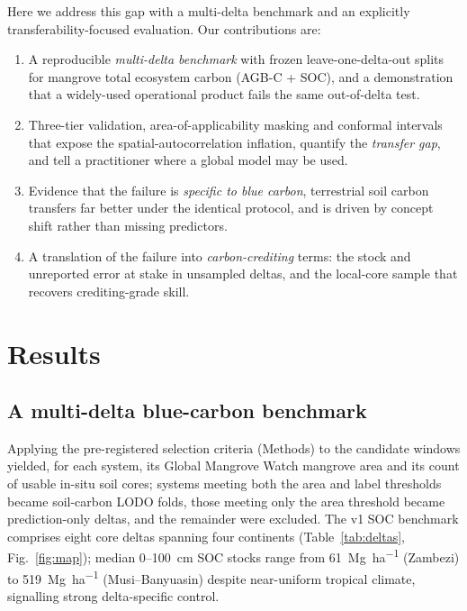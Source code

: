 \documentclass[twocolumn,9pt]{extarticle}
\begin{document}
Here we address this gap with a multi-delta benchmark and an explicitly
transferability-focused evaluation. Our contributions are:
\begin{enumerate}
  \item A reproducible \emph{multi-delta benchmark} with frozen leave-one-delta-out
        splits for mangrove total ecosystem carbon (AGB-C + SOC), and a demonstration
        that a widely-used operational product fails the same out-of-delta test.
  \item Three-tier validation, area-of-applicability masking \cite{meyer2021} and
        conformal intervals that expose the spatial-autocorrelation inflation, quantify
        the \emph{transfer gap}, and tell a practitioner where a global model may be used.
  \item Evidence that the failure is \emph{specific to blue carbon}, terrestrial soil
        carbon transfers far better under the identical protocol, and is driven by
        concept shift rather than missing predictors.
  \item A translation of the failure into \emph{carbon-crediting} terms: the stock and
        unreported error at stake in unsampled deltas, and the local-core sample that
        recovers crediting-grade skill.
\end{enumerate}

\section*{Results}

\subsection*{A multi-delta blue-carbon benchmark}
Applying the pre-registered selection criteria (Methods) to the candidate windows
yielded, for each system, its Global Mangrove Watch mangrove area and its count of
usable in-situ soil cores; systems meeting both the area and label thresholds became
soil-carbon LODO folds, those meeting only the area threshold became prediction-only
deltas, and the remainder were excluded. The v1 SOC benchmark comprises eight core
deltas spanning four continents (Table~\ref{tab:deltas}, Fig.~\ref{fig:map}); median
0--100~cm SOC stocks range from
\SI{61}{\mega\gram\per\hectare} (Zambezi) to \SI{519}{\mega\gram\per\hectare}
(Musi--Banyuasin) despite near-uniform tropical climate, signalling strong
delta-specific control.

\begin{table}[t]
\centering
\caption{Core (leave-one-delta-out) deltas in the v1 SOC benchmark: mangrove area
(GMW v3, 2020, equal-area), usable in-situ SOC cores, and median 0--100~cm SOC stock
(Mg\,ha$^{-1}$).}
\label{tab:deltas}

\end{table}
\end{document}
